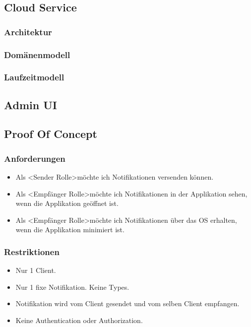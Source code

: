 \clearpage

\subsection{Cloud Service}\label{subsec:cloud-service}

\subsubsection{Architektur}

\subsubsection{Domänenmodell}

\subsubsection{Laufzeitmodell}

\clearpage

\subsection{Admin UI}\label{subsec:admin-ui}

\clearpage

\subsection{Proof Of Concept}\label{subsec:proof-of-concept}
\subsubsection*{Anforderungen}
\begin{itemize}
    \item Als \textless Sender Rolle\textgreater möchte ich Notifikationen versenden können.
    \item Als \textless Empfänger Rolle\textgreater möchte ich Notifikationen in der Applikation sehen, wenn die Applikation geöffnet ist.
    \item Als \textless Empfänger Rolle\textgreater möchte ich Notifikationen über das OS erhalten, wenn die Applikation minimiert ist.
\end{itemize}
\subsubsection*{Restriktionen}
\begin{itemize}
    \item Nur 1 Client.
    \item Nur 1 fixe Notifikation. Keine Types.
    \item Notifikation wird vom Client gesendet und vom selben Client empfangen.
    \item Keine Authentication oder Authorization.
\end{itemize}
